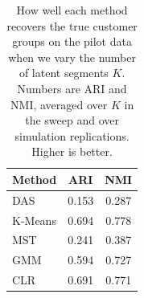 \begin{table}[htbp]
\centering
\caption{How well each method recovers the true customer groups on the pilot data when we vary the number of latent segments $K$. Numbers are ARI and NMI, averaged over $K$ in the sweep and over simulation replications. Higher is better.}
\label{tab:app-ari-nmi-varying-K-avg}
\begin{tabular}{lcc}
\toprule
Method & ARI & NMI \\
\midrule
DAS & 0.153 & 0.287 \\
K-Means & 0.694 & 0.778 \\
MST & 0.241 & 0.387 \\
GMM & 0.594 & 0.727 \\
CLR & 0.691 & 0.771 \\
\bottomrule
\end{tabular}
\end{table}
